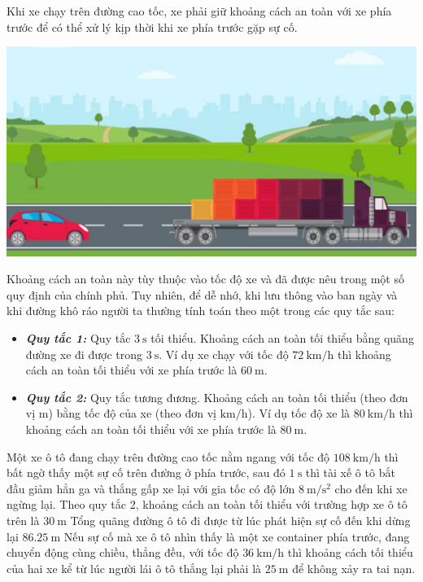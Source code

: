 \begin{ex}
Khi xe chạy trên đường cao tốc, xe phải giữ khoảng cách an toàn với xe phía trước để có thể xử lý kịp thời khi xe phía trước gặp sự cố.
\begin{center}
	\includegraphics[width=0.4\linewidth]{../figs/D10-1-4}
\end{center}	
Khoảng cách an toàn này tùy thuộc vào tốc độ xe và đã được nêu trong một số quy định của chính phủ. Tuy nhiên, để dễ nhớ, khi lưu thông vào ban ngày và khi đường khô ráo người ta thường tính toán theo một trong các quy tắc sau:
\begin{itemize}
	\item \textbf{\textit{Quy tắc 1:}} Quy tắc $\SI{3}{\second}$  tối thiểu. Khoảng cách an toàn tối thiểu bằng quãng đường xe đi được trong $\SI{3}{\second}$. Ví dụ xe chạy với tốc độ $\SI{72}{\kilo\meter/\hour}$  thì khoảng cách an toàn tối thiểu với xe phía trước là $\SI{60}{\meter}$.
	\item \textbf{\textit{Quy tắc 2:}} Quy tắc tương đương. Khoảng cách an toàn tối thiểu (theo đơn vị $\si{\meter}$) bằng tốc độ của xe (theo đơn vị $\si{\kilo\meter/\hour}$). Ví dụ tốc độ xe là $\SI{80}{\kilo\meter/\hour}$  thì khoảng cách an toàn tối thiểu với xe phía trước là $\SI{80}{\meter}$.
\end{itemize}
Một xe ô tô đang chạy trên đường cao tốc nằm ngang với tốc độ $\SI{108}{\kilo\meter/\hour}$  thì bất ngờ thấy một sự cố trên đường ở phía trước, sau đó $\SI{1}{\second}$ thì tài xế ô tô bắt đầu giảm hẳn ga và thắng gấp xe lại với gia tốc có độ lớn $\SI{8}{\meter/\second^2}$ cho đến khi xe ngừng lại.
	{Theo quy tắc 2, khoảng cách an toàn tối thiểu với trường hợp xe ô tô trên là $\SI{30}{\meter}$}
	{\True Tổng quãng đường ô tô đi được từ lúc phát hiện sự cố đến khi dừng lại $\SI{86.25}{\meter}$}
	{\True Nếu sự cố mà xe ô tô nhìn thấy là một xe container phía trước, đang chuyển động cùng chiều, thẳng đều, với tốc độ $\SI{36}{\kilo\meter/\hour}$ thì khoảng cách tối thiểu của hai xe kể từ lúc người lái ô tô thắng lại phải là $\SI{25}{\meter}$ để không xảy ra tai nạn. }

\end{ex}

